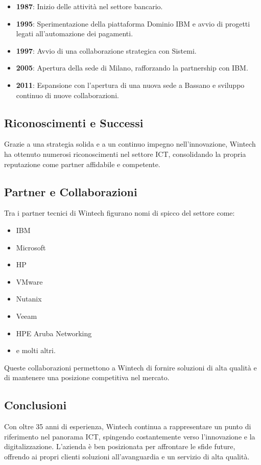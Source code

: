 \begin{itemize}
    \item \textbf{1987}: Inizio delle attività nel settore bancario.
    \item \textbf{1995}: Sperimentazione della piattaforma Dominio IBM e avvio di progetti legati all’automazione dei pagamenti.
    \item \textbf{1997}: Avvio di una collaborazione strategica con Sistemi.
    \item \textbf{2005}: Apertura della sede di Milano, rafforzando la partnership con IBM.
    \item \textbf{2011}: Espansione con l’apertura di una nuova sede a Bassano e sviluppo continuo di nuove collaborazioni.
\end{itemize}

\subsection{Riconoscimenti e Successi}
Grazie a una strategia solida e a un continuo impegno nell'innovazione, Wintech ha ottenuto numerosi riconoscimenti nel settore ICT, consolidando la propria reputazione come partner affidabile e competente.

\subsection{Partner e Collaborazioni}
Tra i partner tecnici di Wintech figurano nomi di spicco del settore come:

\begin{itemize}
    \item IBM
    \item Microsoft
    \item HP
    \item VMware
    \item Nutanix
    \item Veeam
    \item HPE Aruba Networking
    \item e molti altri.
\end{itemize}

Queste collaborazioni permettono a Wintech di fornire soluzioni di alta qualità e di mantenere una posizione competitiva nel mercato.

\subsection{Conclusioni}
Con oltre 35 anni di esperienza, Wintech continua a rappresentare un punto di riferimento nel panorama ICT, spingendo costantemente verso l’innovazione e la digitalizzazione. L'azienda è ben posizionata per affrontare le sfide future, offrendo ai propri clienti soluzioni all'avanguardia e un servizio di alta qualità.


